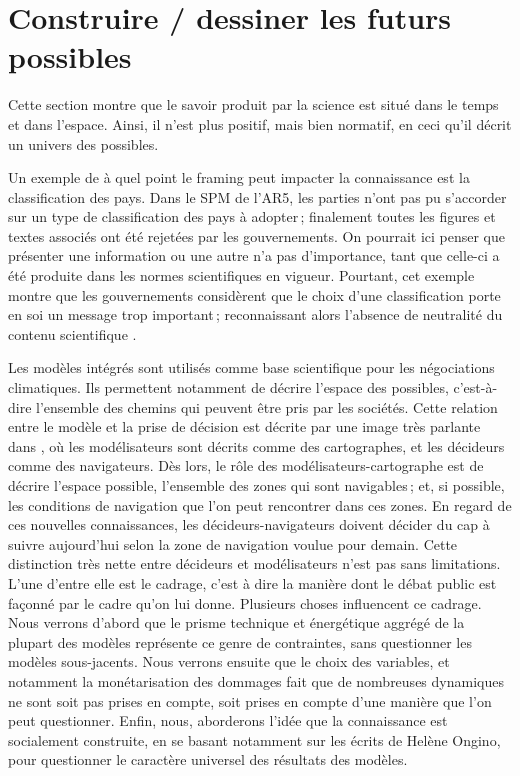\section{Construire / dessiner les futurs possibles}

Cette section montre que le savoir produit par la science est situé dans le temps et dans l'espace. Ainsi, il n'est plus positif, mais bien normatif, en ceci qu'il décrit un univers des possibles. 

Un exemple de à quel point le framing peut impacter la connaissance est la classification des pays. Dans le SPM de l'AR5, les parties n'ont pas pu s'accorder sur un type de classification des pays à adopter ; finalement toutes les figures et textes associés ont été rejetées par les gouvernements. On pourrait ici penser que présenter une information ou une autre n'a pas d'importance, tant que celle-ci a été produite dans les normes scientifiques en vigueur. Pourtant, cet exemple montre que les gouvernements considèrent que le choix d'une classification porte en soi un message trop important ; reconnaissant alors l'absence de neutralité du contenu scientifique \cite{edenhofer_mapmakers_2014}. 

Les modèles intégrés sont utilisés comme base scientifique pour les négociations climatiques. Ils permettent notamment de décrire l'espace des possibles, c'est-à-dire l'ensemble des chemins qui peuvent être pris par les sociétés. Cette relation entre le modèle et la prise de décision est décrite par une image très parlante dans \cite{edenhofer_mapmakers_2014}, où les modélisateurs sont décrits comme des cartographes, et les décideurs comme des navigateurs. Dès lors, le rôle des modélisateurs-cartographe est de décrire l'espace possible, l'ensemble des zones qui sont navigables ; et, si possible, les conditions de navigation que l'on peut rencontrer dans ces zones.  En regard de ces nouvelles connaissances, les décideurs-navigateurs doivent décider du cap à suivre aujourd'hui selon la zone de navigation voulue pour demain. Cette distinction très nette entre décideurs et modélisateurs n'est pas sans limitations. L'une d'entre elle est le cadrage, c'est à dire la manière dont le débat public est façonné par le cadre qu'on lui donne.  Plusieurs choses influencent ce cadrage. Nous verrons d'abord que le prisme technique et énergétique aggrégé de la plupart des modèles représente ce genre de contraintes, sans questionner les modèles sous-jacents. Nous verrons ensuite que le choix des variables, et notamment la monétarisation des dommages fait que de nombreuses dynamiques ne sont soit pas prises en compte, soit prises en compte d'une manière que l'on peut questionner. Enfin, nous, aborderons l'idée que la connaissance est socialement construite, en se basant notamment sur les écrits de Helène Ongino, pour questionner le caractère universel des résultats des modèles. 

